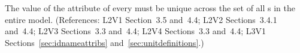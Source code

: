 The value of the  attribute of every \UnitDefinition must be
unique across the set of all \UnitDefinition{}s in the entire
model.  (References: L2V1 Section~3.5 and~4.4; L2V2 Sections~3.4.1 and~4.4;
L2V3 Sections~3.3 and~4.4; L2V4 Sections~3.3 and~4.4; L3V1 
Sections~\ref{sec:idnameattribs} and~\ref{sec:unitdefinitions}.)
